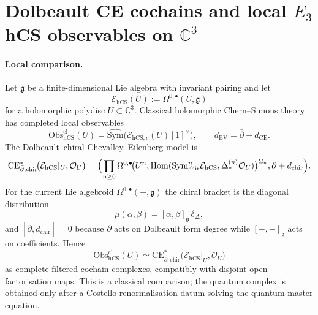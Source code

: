 \providecommand{\Obs}{\mathrm{Obs}}
\providecommand{\hCS}{\mathrm{hCS}}
\providecommand{\CE}{\mathrm{CE}}
\providecommand{\Ch}{\mathrm{Ch}}
\providecommand{\Dolb}{\mathrm{Dolb}}
\providecommand{\Conf}{\mathrm{Conf}}
\providecommand{\chir}{\mathrm{chir}}
\providecommand{\dbar}{\bar\partial}
\providecommand{\kch}{\kappa_{\mathrm{ch}}}
\providecommand{\Ran}{\mathrm{Ran}}
\providecommand{\Sym}{\mathrm{Sym}}
\providecommand{\Hom}{\mathrm{Hom}}
\providecommand{\C}{\mathbb{C}}
\providecommand{\cO}{\mathcal{O}}
\providecommand{\cE}{\mathcal{E}}
\providecommand{\cZ}{\mathcal{Z}}
\providecommand{\g}{\mathfrak{g}}
\providecommand{\HHch}{\mathrm{HH}^{\mathrm{ch}}}
\providecommand{\Rep}{\mathrm{Rep}}
\providecommand{\Alg}{\mathrm{Alg}}
\providecommand{\Fact}{\mathrm{Fact}}
\providecommand{\Hol}{\mathrm{Hol}}
\providecommand{\QME}{\mathrm{QME}}
\providecommand{\PhiFA}{\Phi^{\mathrm{FA}}}
\providecommand{\HH}{\mathrm{HH}}

\section*{Dolbeault CE cochains and local $E_3$ hCS observables on $\C^3$}

\paragraph{Local comparison.}
Let $\g$ be a finite-dimensional Lie algebra with invariant pairing and let
\[
  \cE_{\hCS}(U):=\Omega^{0,\bullet}(U,\g)
\]
for a holomorphic polydisc $U\subset \C^3$.  Classical holomorphic
Chern--Simons theory has completed local observables
\[
  \Obs^{\mathrm{cl}}_{\hCS}(U)
  =
  \widehat{\Sym}\bigl(\cE_{\hCS,c}(U)[1]^\vee\bigr),
  \qquad
  d_{\mathrm{BV}}=\dbar+d_{\CE}.
\]
The Dolbeault--chiral Chevalley--Eilenberg model is
\[
  \CE^*_{\dbar,\chir}\!\bigl(\cE_{\hCS}|_U,\cO_U\bigr)
  =
  \Bigl(
    \prod_{n\geq 0}
    \Omega^{0,\bullet}\!\bigl(U^n,
      \Hom(\Sym^n_{\chir}\cE_{\hCS},\Delta^{(n)}_*\cO_U)\bigr)^{\Sigma_n},
    \dbar+d_{\chir}
  \Bigr).
\]
For the current Lie algebroid $\Omega^{0,\bullet}(-,\g)$ the chiral
bracket is the diagonal distribution
\[
  \mu(\alpha,\beta)=[\alpha,\beta]_\g\,\delta_\Delta ,
\]
and $[\dbar,d_{\chir}]=0$ because $\dbar$ acts on Dolbeault form degree
while $[-,-]_\g$ acts on coefficients.  Hence
\[
  \Obs^{\mathrm{cl}}_{\hCS}(U)
  \simeq
  \CE^*_{\dbar,\chir}\!\bigl(\cE_{\hCS}|_U,\cO_U\bigr)
\]
as complete filtered cochain complexes, compatibly with disjoint-open
factorisation maps.  This is a classical comparison; the quantum complex
is obtained only after a Costello renormalisation datum solving the
quantum master equation.

